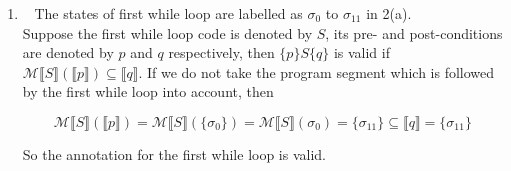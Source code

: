 \documentclass[11pt]{article}
\begin{document}
\begin{enumerate}
\begin{enumerate}
\begin{lstlisting}[escapeinside={(*}{*)}]
			if X[i]=C then
					(*$\{n \geq 0 \land i \leq n \land M > 0 \land Count \geq 0 \land X[i]=C\}$*)
					Count := Count+1
					(*$\{n \geq 0 \land i \leq n \land M > 0 \land Count > 0 \land X[i]=C\}$*)
			fi;
			(*$\{n \geq 0 \land i \leq n \land M > 0 \land Count \geq 0\}$*)
			i := i+1
			(*$\{n \geq 0 \land i \leq n+1 \land M > 0 \land Count \geq 0\}$*)
		od;
		(*$\{n \geq 0 \land i = n+1 \land M > 0 \land Count \geq 0\}$*)
		if Count>n/2 then
					(*$\{n \geq 0 \land i = n+1 \land M > 0 \land Count>\frac{n}{2}\}$*)
					Majority := C
					(*$\{n \geq 0 \land i = n+1 \land M > 0 \land Count>\frac{n}{2} \land Majority = C\}$*)
				else
					(*$\{n \geq 0 \land i = n+1 \land M > 0 \land 0 \leq Count \leq \frac{n}{2}\}$*)
					Majority := -1
				(*$\{n \geq 0 \land i = n+1 \land M > 0 \land 0 \leq Count \leq \frac{n}{2} \land Majority = -1\}$*)
		fi
		(*$\{n \geq 0 \land i = n+1 \land M > 0 \land 0 \leq Count \leq \frac{n}{2}\}$*)
fi
(*$\{i = n+1 \land M \geq 0\}$*)
\end{lstlisting}
			\item ~
				The states of first while loop are labelled as $\sigma_{0}$ to $\sigma_{11}$ in 2(a).\\
				Suppose the first while loop code is denoted by $S$, its pre- and post-conditions are denoted by $p$ and $q$ respectively, then $\{p\}S\{q\}$ is valid if $\mathcal{M}\llbracket S \rrbracket (\llbracket p \rrbracket) \subseteq \llbracket q \rrbracket$.
				If we do not take the program segment which is followed by the first while loop into account, then

				$$\mathcal{M}\llbracket S \rrbracket (\llbracket p \rrbracket) = \mathcal{M}\llbracket S \rrbracket (\{\sigma_{0}\}) = \mathcal{M}\llbracket S \rrbracket (\sigma_{0}) = \{\sigma_{11}\} \subseteq \llbracket q \rrbracket = \{\sigma_{11}\}$$

				So the annotation for the first while loop is valid.
		\end{enumerate}
	\end{enumerate}
\end{document}
